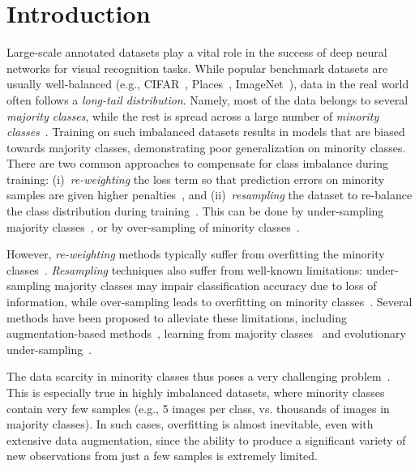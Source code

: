\documentclass[nohyperref]{article}
\theoremstyle{plain}
\theoremstyle{definition}
\theoremstyle{remark}
\begin{document}
\section{Introduction}
\label{sec:intro}
Large-scale annotated datasets play a vital role in the success of deep neural networks for visual recognition tasks. While popular benchmark datasets are usually well-balanced (e.g., CIFAR~\cite{krizhevsky2009learning}, Places~\cite{zhou2017places}, ImageNet~\cite{deng2009imagenet}), data in the real world often follows a \emph{long-tail distribution}. Namely, most of the data belongs to several \emph{majority classes}, while the rest is spread across a large number of \emph{minority classes}~\cite{buda2018systematic, reed2001pareto, liu2019large}. 
Training on such imbalanced datasets results in models that are biased towards majority classes, demonstrating poor generalization on minority classes. There are two common approaches to compensate for class imbalance during training: (i)~\textit{re-weighting} the loss term so that prediction errors on minority samples are given higher penalties~\cite{huang2016learning, cui2019class, hong2021disentangling, ren2020balanced}, and (ii)~\textit{resampling} the dataset to re-balance the class distribution during training~\cite{chawla2002smote, kim2020m2m, mullick2019generative}.
This can be done by under-sampling majority classes~\cite{drummond2003c4}, or by over-sampling of minority classes~\cite{shen2016relay, haixiang2017learning, kang2019decoupling}.

However, \textit{re-weighting} methods typically suffer from overfitting the minority classes~\cite{kim2020m2m}. \textit{Resampling} techniques also suffer from well-known limitations: under-sampling majority classes may impair classification accuracy due to loss of information, while over-sampling leads to overfitting on minority classes~\cite{buda2018systematic}. Several methods have been proposed to alleviate these limitations, including augmentation-based methods~\cite{chu2020feature, mullick2019generative, liu2020deep}, learning from majority classes~\cite{kim2020m2m} and evolutionary under-sampling~\cite{galar2013eusboost}.

The data scarcity in minority classes thus  poses a very challenging problem~\cite{kim2020m2m}. This is especially true in highly imbalanced datasets, where minority classes contain very few samples (e.g., 5 images per class, vs. thousands of images in majority classes). In such cases, overfitting is almost inevitable, even with extensive data augmentation, since the ability to produce a significant variety of new observations from just a few  samples is extremely limited. 
\end{document}

